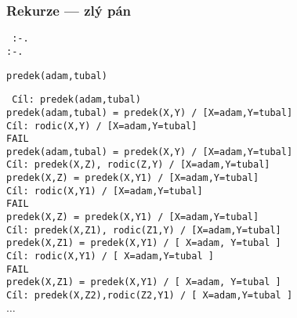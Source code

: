 \documentclass[red,professionalfont]{beamer}
\theoremstyle{definition}
\newcommand{\0}{\mbox{${\bf 0}$}}
\begin{document}
\begin{frame}\frametitle{Rekurze --- zlý pán}
 {\tt
{}:-.\pause\\
:-.
}\pause

\begin{block}{}
\begin{center}
{\tt predek(adam,tubal)}
\end{center}
\end{block}\pause
{\tiny\tt
Cíl: predek(adam,tubal)\pause\\
\hskip0.5cm  predek(adam,tubal) = predek(X,Y) / [X=adam,Y=tubal]\pause\\
\hskip1cm    Cíl: rodic(X,Y) / [X=adam,Y=tubal]\pause\\
\hskip1.5cm    \alert{FAIL}\pause\\
\hskip0.5cm  predek(adam,tubal) = predek(X,Y) / [X=adam,Y=tubal]\pause\\
\hskip1cm    Cíl: predek(X,Z), rodic(Z,Y) / [X=adam,Y=tubal]\pause\\
\hskip1.5cm    predek(X,Z) = predek(X,Y1) / [X=adam,Y=tubal]\pause\\
\hskip2cm        Cíl: rodic(X,Y1) / [X=adam,Y=tubal]\pause\\
\hskip2.5cm	  \alert{FAIL}\pause\\
\hskip1.5cm    predek(X,Z) = predek(X,Y1) / [X=adam,Y=tubal]\pause\\
\hskip2cm        Cíl: predek(X,Z1), rodic(Z1,Y) / [X=adam,Y=tubal]\pause\\
\hskip2.5cm        predek(X,Z1) = predek(X,Y1) / [ X=adam, Y=tubal ]\pause\\
\hskip3cm            Cíl: rodic(X,Y1) / [ X=adam,Y=tubal ]\pause\\
\hskip3.5cm	       \alert{FAIL}\pause\\
\hskip2.5cm        predek(X,Z1) = predek(X,Y1) / [ X=adam, Y=tubal ]\pause\\
\hskip3cm            Cíl: predek(X,Z2),rodic(Z2,Y1) / [ X=adam,Y=tubal ]\pause\\
\hskip3.5cm		\alert{$\ldots$}
}
\end{frame}
\end{document}
